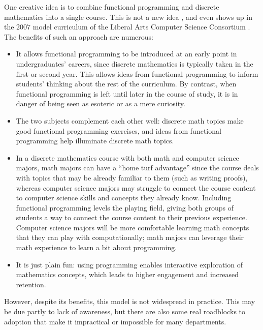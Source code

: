 \documentclass[submission,copyright,creativecommons]{eptcs}
\begin{document}
One creative idea is to combine functional programming and discrete
mathematics into a single course.  This is not a new idea
\cite{Wainwright:1992, Henderson:2002, Scharff:2002, Doets:2004,
  ODonnell:2006, VanDrunen:2011, Xing:2008}, and even shows up
in the 2007 model curriculum of the Liberal Arts Computer Science
Consortium \cite{LiberalArtsComputerScienceConsortium:2007}. The
benefits of such an approach are numerous:
\begin{itemize}
\item It allows functional programming to be introduced at an early
  point in undergraduates' careers, since discrete mathematics is
  typically taken in the first or second year.  This allows ideas from
  functional programming to inform students' thinking about the rest
  of the curriculum.  By contrast, when functional programming is left
  until later in the course of study, it is in danger of being seen as
  esoteric or as a mere curiosity.
\item The two subjects complement each other well: discrete math
  topics make good functional programming exercises, and ideas from
  functional programming help illuminate discrete math topics.
\item In a discrete mathematics course with both math and
  computer science majors, math majors can have a ``home turf
  advantage'' since the course deals with topics that may be already
  familiar to them (such as writing proofs), whereas computer science
  majors may struggle to connect the course content to computer
  science skills and concepts they already know.  Including functional
  programming levels the playing field, giving both groups of students
  a way to connect the course content to their previous experience.
  Computer science majors will be more comfortable learning math
  concepts that they can play with computationally; math majors can
  leverage their math experience to learn a bit about programming.
\item It is just plain fun: using programming enables interactive
  exploration of mathematics concepts, which leads to higher
  engagement and increased retention.
\end{itemize}

However, despite its benefits, this model is not widespread in
practice.  This may be due partly to lack of awareness, but there are
also some real roadblocks to adoption that make it impractical or
impossible for many departments.
\end{document}

